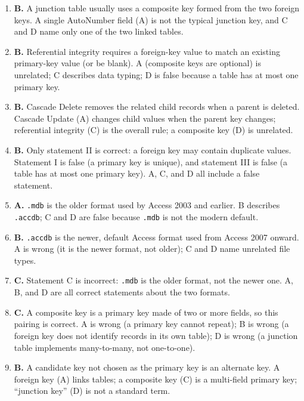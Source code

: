 \begin{enumerate}[label=\textbf{Q\arabic*.}, leftmargin=*]
  directly; one-to-zero (D) is not a standard type.
\item \textbf{B.} A junction table usually uses a composite key formed from
  the two foreign keys. A single AutoNumber field (A) is not the typical
  junction key, and C and D name only one of the two linked tables.
\item \textbf{B.} Referential integrity requires a foreign-key value to match
  an existing primary-key value (or be blank). A (composite keys are optional)
  is unrelated; C describes data typing; D is false because a table has at
  most one primary key.
\item \textbf{B.} Cascade Delete removes the related child records when a
  parent is deleted. Cascade Update (A) changes child values when the parent
  key changes; referential integrity (C) is the overall rule; a composite key
  (D) is unrelated.
\item \textbf{B.} Only statement II is correct: a foreign key may contain
  duplicate values. Statement I is false (a primary key is unique), and
  statement III is false (a table has at most one primary key). A, C, and D
  all include a false statement.
\item \textbf{A.} \texttt{.mdb} is the older format used by Access 2003 and
  earlier. B describes \texttt{.accdb}; C and D are false because
  \texttt{.mdb} is not the modern default.
\item \textbf{B.} \texttt{.accdb} is the newer, default Access format used
  from Access 2007 onward. A is wrong (it is the newer format, not older); C
  and D name unrelated file types.
\item \textbf{C.} Statement C is incorrect: \texttt{.mdb} is the older
  format, not the newer one. A, B, and D are all correct statements about the
  two formats.
\item \textbf{C.} A composite key is a primary key made of two or more
  fields, so this pairing is correct. A is wrong (a primary key cannot
  repeat); B is wrong (a foreign key does not identify records in its own
  table); D is wrong (a junction table implements many-to-many, not
  one-to-one).
\item \textbf{B.} A candidate key not chosen as the primary key is an
  alternate key. A foreign key (A) links tables; a composite key (C) is a
  multi-field primary key; ``junction key'' (D) is not a standard term.


\end{enumerate}
